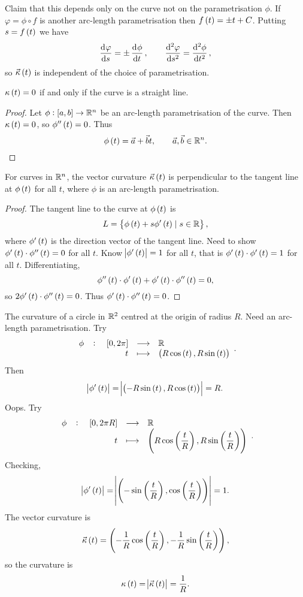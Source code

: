 Claim that this depends only on the curve not on the parametrisation $ \phi $. If $ \varphi = \phi \circ f $ is another arc-length parametrisation then $ f\br{t} = \pm t + C $. Putting $ s = f\br{t} $ we have
$$ \dod{\varphi}{s} = \pm\dod{\phi}{t}, \qquad \dod[2]{\varphi}{s} = \dod[2]{\phi}{t}, $$
so $ \vec{\kappa}\br{t} $ is independent of the choice of parametrisation.

\begin{proposition}
$ \kappa\br{t} = 0 $ if and only if the curve is a straight line.
\end{proposition}

\begin{proof}
Let $ \phi : \sbr{a, b} \to \R^n $ be an arc-length parametrisation of the curve. Then $ \kappa\br{t} = 0 $, so $ \phi''\br{t} = 0 $. Thus
$$ \phi\br{t} = \vec{a} + \vec{b}t, \qquad \vec{a}, \vec{b} \in \R^n. $$
\end{proof}

\begin{proposition}
For curves in $ \mathbb{R}^n $, the vector curvature $ \vec{\kappa}\br{t} $ is perpendicular to the tangent line at $ \phi\br{t} $ for all $ t $, where $ \phi $ is an arc-length parametrisation.
\end{proposition}

\begin{proof}
The tangent line to the curve at $ \phi\br{t} $ is
$$ L = \cbr{\phi\br{t} + s\phi'\br{t} \mid s \in \R}, $$
where $ \phi'\br{t} $ is the direction vector of the tangent line. Need to show $ \phi'\br{t} \cdot \phi''\br{t} = 0 $ for all $ t $. Know $ \abs{\phi'\br{t}} = 1 $ for all $ t $, that is $ \phi'\br{t} \cdot \phi'\br{t} = 1 $ for all $ t $. Differentiating,
$$ \phi''\br{t} \cdot \phi'\br{t} + \phi'\br{t} \cdot \phi''\br{t} = 0, $$
so $ 2\phi'\br{t} \cdot \phi''\br{t} = 0 $. Thus $ \phi'\br{t} \cdot \phi''\br{t} = 0 $.
\end{proof}

\begin{example*}
The curvature of a circle in $ \mathbb{R}^2 $ centred at the origin of radius $ R $. Need an arc-length parametrisation. Try
$$ \function[\phi]{\sbr{0, 2\pi}}{\R}{t}{\br{R\cos\br{t}, R\sin\br{t}}}. $$
Then
$$ \abs{\phi'\br{t}} = \abs{\br{-R\sin\br{t}, R\cos\br{t}}} = R. $$
Oops. Try
$$ \function[\phi]{\sbr{0, 2\pi R}}{\R}{t}{\br{R\cos\br{\dfrac{t}{R}}, R\sin\br{\dfrac{t}{R}}}}. $$
Checking,
$$ \abs{\phi'\br{t}} = \abs{\br{-\sin\br{\dfrac{t}{R}}, \cos\br{\dfrac{t}{R}}}} = 1. $$
The vector curvature is
$$ \vec{\kappa}\br{t} = \br{-\dfrac{1}{R}\cos\br{\dfrac{t}{R}}, -\dfrac{1}{R}\sin\br{\dfrac{t}{R}}}, $$
so the curvature is
$$ \kappa\br{t} = \abs{\vec{\kappa}\br{t}} = \dfrac{1}{R}. $$
\end{example*}

